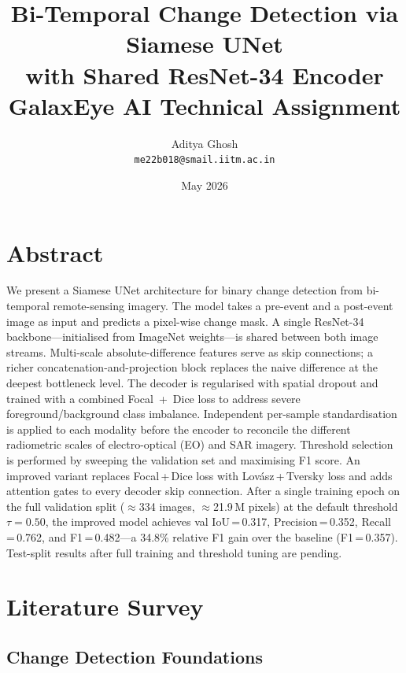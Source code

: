 \documentclass[12pt,a4paper]{article}
\title{\textbf{Bi-Temporal Change Detection via Siamese UNet\\
with Shared ResNet-34 Encoder}\\[0.5em]
\large GalaxEye AI Technical Assignment}
\author{Aditya Ghosh\\
\texttt{me22b018@smail.iitm.ac.in}}
\date{May 2026}
\begin{document}
\maketitle
\tableofcontents
\newpage

\section{Abstract}

We present a Siamese UNet architecture for binary change detection from bi-temporal
remote-sensing imagery.  The model takes a pre-event and a post-event image as input and
predicts a pixel-wise change mask.  A single ResNet-34 backbone---initialised from
ImageNet weights---is shared between both image streams.  Multi-scale absolute-difference
features serve as skip connections; a richer concatenation-and-projection block replaces
the naive difference at the deepest bottleneck level.  The decoder is regularised with
spatial dropout and trained with a combined Focal~+~Dice loss to address severe
foreground/background class imbalance.  Independent per-sample standardisation is applied
to each modality before the encoder to reconcile the different radiometric scales of
electro-optical (EO) and SAR imagery.  Threshold selection is performed by sweeping the
validation set and maximising F1 score.  An improved variant replaces Focal\,+\,Dice
loss with Lovász\,+\,Tversky loss and adds attention gates to every decoder skip
connection.  After a single training epoch on the full validation split
($\approx$334 images, $\approx$21.9\,M pixels) at the default threshold $\tau=0.50$,
the improved model achieves val IoU\,=\,0.317, Precision\,=\,0.352, Recall\,=\,0.762,
and F1\,=\,0.482---a 34.8\% relative F1 gain over the baseline (F1\,=\,0.357).
Test-split results after full training and threshold tuning are pending.

\section{Literature Survey}

\subsection{Change Detection Foundations}
\end{document}
